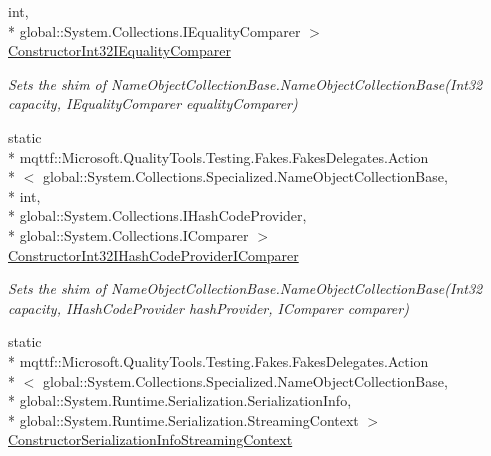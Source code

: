 \begin{DoxyCompactItemize}
int, \\*
global\-::\-System.\-Collections.\-I\-Equality\-Comparer $>$ \hyperlink{class_system_1_1_collections_1_1_specialized_1_1_fakes_1_1_shim_name_object_collection_base_ac4e3d2b56248eaec23c4f0824484f253}{Constructor\-Int32\-I\-Equality\-Comparer}
\begin{DoxyCompactList}\small\item\em Sets the shim of Name\-Object\-Collection\-Base.\-Name\-Object\-Collection\-Base(\-Int32 capacity, I\-Equality\-Comparer equality\-Comparer)\end{DoxyCompactList}\item 
static \\*
mqttf\-::\-Microsoft.\-Quality\-Tools.\-Testing.\-Fakes.\-Fakes\-Delegates.\-Action\\*
$<$ global\-::\-System.\-Collections.\-Specialized.\-Name\-Object\-Collection\-Base, \\*
int, \\*
global\-::\-System.\-Collections.\-I\-Hash\-Code\-Provider, \\*
global\-::\-System.\-Collections.\-I\-Comparer $>$ \hyperlink{class_system_1_1_collections_1_1_specialized_1_1_fakes_1_1_shim_name_object_collection_base_ae2684c306d847e9e06b21fdc95467955}{Constructor\-Int32\-I\-Hash\-Code\-Provider\-I\-Comparer}
\begin{DoxyCompactList}\small\item\em Sets the shim of Name\-Object\-Collection\-Base.\-Name\-Object\-Collection\-Base(\-Int32 capacity, I\-Hash\-Code\-Provider hash\-Provider, I\-Comparer comparer)\end{DoxyCompactList}\item 
static \\*
mqttf\-::\-Microsoft.\-Quality\-Tools.\-Testing.\-Fakes.\-Fakes\-Delegates.\-Action\\*
$<$ global\-::\-System.\-Collections.\-Specialized.\-Name\-Object\-Collection\-Base, \\*
global\-::\-System.\-Runtime.\-Serialization.\-Serialization\-Info, \\*
global\-::\-System.\-Runtime.\-Serialization.\-Streaming\-Context $>$ \hyperlink{class_system_1_1_collections_1_1_specialized_1_1_fakes_1_1_shim_name_object_collection_base_a3dabf1a7d5300ff2a775e0629b86f3d7}{Constructor\-Serialization\-Info\-Streaming\-Context}

\end{DoxyCompactItemize}
